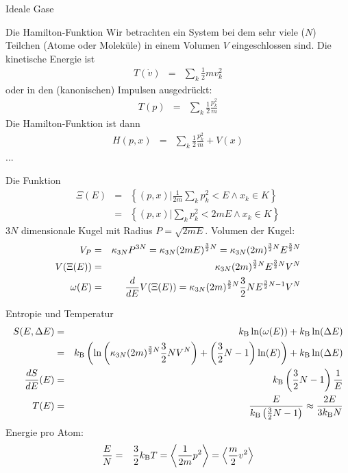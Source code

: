 \begin{chapter}{\titlestr}
\begin{section}{Ideale Gase}
\begin{subsection}{Die Hamilton-Funktion}
Wir betrachten ein System bei dem sehr viele ($N$) Teilchen (Atome oder Moleküle) in einem Volumen $V$ eingeschlossen sind.
Die kinetische Energie ist
\begin{eqnarray*}
T(\dot{v}) &=& \sum_k \frac{1}{2}mv_k^2
\end{eqnarray*}
oder in den (kanonischen) Impulsen ausgedrückt:
\begin{eqnarray*}
T(p) &=& \sum_k \frac{1}{2}\frac{p_k^2}{m}
\end{eqnarray*}
Die Hamilton-Funktion ist dann
\begin{eqnarray*}
H(p,x) &=& \sum_k \frac{1}{2}\frac{p_k^2}{m}+V(x)
\end{eqnarray*}
...
\end{subsection}

\begin{subsection}{Die Funktion }
\begin{eqnarray*}
\Xi(E) &=& \left\{(p,x)|\frac{1}{2m}\sum_k p_k^2<E\land x_k\in K\right\}\\
&=& \left\{(p,x)|\sum_k p_k^2<2mE\land x_k\in K\right\}
\end{eqnarray*}
$3N$ dimensionale Kugel mit Radius $P=\sqrt{2mE}$. Volumen der Kugel:
\begin{eqnarray}
\label{omega_ideal}
V_P &=& \kappa_{3N}P^{3N} = \kappa_{3N}(2mE)^{\frac{3}{2}N}=\kappa_{3N}(2m)^{\frac{3}{2}N}E^{\frac{3}{2}N}\cr
V(\Xi(E)) &=& \kappa_{3N}(2m)^{\frac{3}{2}N}E^{\frac{3}{2}N}V^N\cr
\omega(E) &=& \frac{d}{dE}V(\Xi(E))=\kappa_{3N}(2m)^{\frac{3}{2}N}\frac{3}{2}NE^{\frac{3}{2}N-1}V^N
\end{eqnarray}
\end{subsection}

\begin{subsection}{Entropie und Temperatur}
\begin{eqnarray*}
S(E,\Delta E) &=& k_{\mathrm{B}}  \ln(\omega(E))+k_{\mathrm{B}} \ln(\Delta E)\\
&=&k_{\mathrm{B}} \left(\ln\left(\kappa_{3N}(2m)^{\frac{3}{2}N}\frac{3}{2}NV^N\right)+\left(\frac{3}{2}N-1\right)\ln(E)\right)+k_{\mathrm{B}} \ln(\Delta E)\\
\frac{dS}{dE}(E) &=& k_{\mathrm{B}} \left(\frac{3}{2}N-1\right)\frac{1}{E}\\
T(E) &=& \frac{E}{k_{\mathrm{B}} \left(\frac{3}{2}N-1\right)}\approx \frac{2E}{3k_{\mathrm{B}} N}
\end{eqnarray*}
Energie pro Atom:
\begin{eqnarray}
\label{energy_per_atom}
\frac{E}{N} &=& \frac{3}{2}k_{\mathrm{B}} T=\left<\frac{1}{2m}p^2\right>=\left<\frac{m}{2}v^2\right>
\end{eqnarray}



\end{subsection}
\end{section}
\end{chapter}
